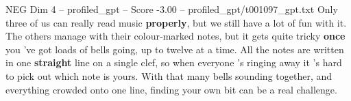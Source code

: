 \begin{textsample}{NEG Dim 4 – profiled\_gpt – Score -3.00 – profiled\_gpt/t001097\_gpt.txt}  \label{ex:f4_neg_007}
Only three of us can really read music \textbf{properly}, but we still have a lot of fun with it.
The others manage with their colour‑marked notes, but it gets quite tricky \textbf{once} you ’ve got loads of bells going, up to twelve at a time.
All the notes are written in one \textbf{straight} line on a single clef, so when everyone ’s ringing away it ’s hard to pick out which note is yours.
With that many bells sounding together, and everything crowded onto one line, finding your own bit can be a real challenge.

\end{textsample}
